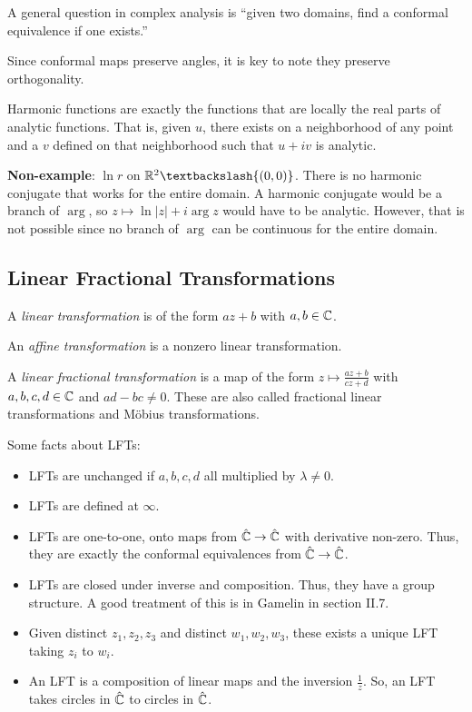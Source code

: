 \documentclass[11pt,leqno,oneside]{amsart}
\begin{document}
A general question in complex analysis is ``given two domains, find a conformal
equivalence if one exists.''

Since conformal maps preserve angles, it is key to note they preserve
orthogonality.

\begin{rmk}
  Harmonic functions are exactly the functions that are locally the real parts
  of analytic functions. That is, given $u$, there exists on a neighborhood of
  any point and a $v$ defined on that neighborhood such that $u+iv$ is
  analytic.
\end{rmk}

\begin{example}
  \textbf{Non-example}: $\ln r$ on $\R^2 \textbackslash \{(0,0)\}$. There is no
  harmonic conjugate that works for the entire domain. A harmonic conjugate
  would be a branch of $\arg$, so $z \mapsto \ln|z|+i\arg z$ would have to be
  analytic. However, that is not possible since no branch of $\arg$ can be
  continuous for the entire domain.
\end{example}

\subsection{Linear Fractional Transformations}
\begin{defn}
    A \emph{linear transformation} is of the form $az + b$ with $a,b \in {\mathbb C}$.
\end{defn}
\begin{defn}
    An \emph{affine transformation} is a nonzero linear transformation.
\end{defn}
\begin{defn}
    A \emph{linear fractional transformation} is a map of the form $z \mapsto
    \frac{az+b}{cz+d}$ with $a,b,c,d \in {\mathbb C}$ and $ad-bc \neq 0$. These are also
    called fractional linear transformations and M{\"o}bius transformations.
  \end{defn}

  Some facts about LFTs:
  \begin{itemize}
  \item LFTs are unchanged if $a,b,c,d$ all multiplied by $\lambda \neq 0$.
  \item LFTs are defined at $\infty$.
  \item LFTs are one-to-one, onto maps from $\hat{{\mathbb C}} \to \hat{{\mathbb C}}$ with
    derivative non-zero. Thus, they are exactly the conformal equivalences from
    $\hat{{\mathbb C}} \to \hat{{\mathbb C}}$.
  \item LFTs are closed under inverse and composition. Thus, they have a group
    structure. A good treatment of this is in Gamelin in section II.7.
  \item Given distinct $z_1,z_2,z_3$ and distinct $w_1,w_2,w_3$, these exists a
    unique LFT taking $z_i$ to $w_i$.
    \item An LFT is a composition of linear maps and the inversion
      $\frac{1}{z}$. So, an LFT takes circles in $\hat{{\mathbb C}}$ to circles in
      $\hat{{\mathbb C}}$.
  \end{itemize}
\end{document}
